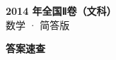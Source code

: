 \documentclass[zihao=-4, a4paper]{ctexart}
\begin{document}
\begin{center}
  {\Large\bfseries 2014 年全国Ⅱ卷（文科）}\\[4pt]
  {\large 数学 · 简答版}
\end{center}
\medskip
{}

\clearpage
{}
\begin{center}{\Large\bfseries 答案速查}\end{center}
\medskip

\end{document}
